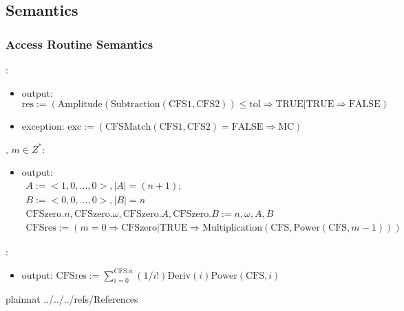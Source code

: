 \documentclass[12pt, titlepage]{article}
\begin{document}
\subsection{Semantics}


\subsubsection{Access Routine Semantics}

\noindent {}:
\begin{itemize}
\item output: $\text{res}:=(\text{Amplitude}(\text{Subtraction}(\text{CFS1}, \text{CFS2}))\le \text{tol}\Rightarrow \text{TRUE}|\text{TRUE}\Rightarrow\text{FALSE})$ 
\item exception: $\text{exc}:=(\text{CFSMatch}(\text{CFS1}, \text{CFS2})=\text{FALSE}\Rightarrow\text{MC})$ 
\end{itemize}

\noindent {}, $m\in Z^{*}$\li{)}:
\begin{itemize}
	\item output: 
	\begin{gather*}
	A:=<1, 0, ..., 0>, |A|=(n+1);\\ 
	B:=<0, 0, ..., 0>, |B|=n\\
	\text{CFSzero}.n, \text{CFSzero}.\omega, \text{CFSzero}.A, \text{CFSzero}.B:=n, \omega, A, B\\
	\text{CFSres}:=(m=0\Rightarrow \text{CFSzero}|\text{TRUE}\Rightarrow \text{Multiplication}(\text{CFS}, \text{Power}(\text{CFS}, m-1)))
	\end{gather*}
\end{itemize}

\noindent {}:
\begin{itemize}
	\item output: $\text{CFSres}:=\sum_{i=0}^{\text{CFS}.n}(1/i!)\text{Deriv}(i)\text{Power}(\text{CFS}, i)$
\end{itemize}

\newpage

 {plainnat}
 {../../../refs/References}

\newpage

\appendix

\end{document}
